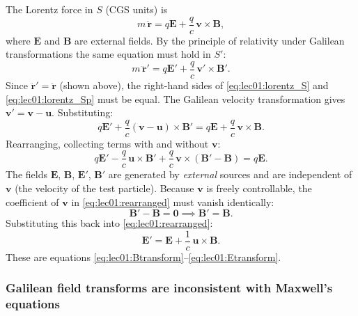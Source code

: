 The Lorentz force in $S$ (CGS units) is
\begin{equation}
  m\,\ddot{\mathbf{r}} = q\mathbf{E} + \frac{q}{c}\,\mathbf{v}\times\mathbf{B},
  \label{eq:lec01:lorentz_S}
\end{equation}
where $\mathbf{E}$ and $\mathbf{B}$ are external fields.
By the principle of relativity under Galilean transformations the same
equation must hold in $S'$:
\begin{equation}
  m\,\ddot{\mathbf{r}}' = q\mathbf{E}' + \frac{q}{c}\,\mathbf{v}'\times\mathbf{B}'.
  \label{eq:lec01:lorentz_Sp}
\end{equation}
Since $\ddot{\mathbf{r}}' = \ddot{\mathbf{r}}$ (shown above), the
right-hand sides of \eqref{eq:lec01:lorentz_S} and
\eqref{eq:lec01:lorentz_Sp} must be equal.
The Galilean velocity transformation gives
$\mathbf{v}' = \mathbf{v} - \mathbf{u}$.  Substituting:
\begin{equation}
  q\mathbf{E}' + \frac{q}{c}(\mathbf{v}-\mathbf{u})\times\mathbf{B}'
  = q\mathbf{E} + \frac{q}{c}\,\mathbf{v}\times\mathbf{B}.
  \label{eq:lec01:lorentz-force-match}
\end{equation}
Rearranging, collecting terms with and without $\mathbf{v}$:
\begin{equation}
  q\mathbf{E}' - \frac{q}{c}\,\mathbf{u}\times\mathbf{B}'
  + \frac{q}{c}\,\mathbf{v}\times(\mathbf{B}'-\mathbf{B})
  = q\mathbf{E}.
  \label{eq:lec01:rearranged}
\end{equation}
The fields $\mathbf{E}$, $\mathbf{B}$, $\mathbf{E}'$, $\mathbf{B}'$
are generated by \emph{external} sources and are independent of
$\mathbf{v}$ (the velocity of the test particle).  Because $\mathbf{v}$
is freely controllable, the coefficient of $\mathbf{v}$ in
\eqref{eq:lec01:rearranged} must vanish identically:
\begin{equation}
  \mathbf{B}' - \mathbf{B} = \mathbf{0}
  \implies
  \mathbf{B}' = \mathbf{B}.
  \label{eq:lec01:Btransform-derived}
\end{equation}
Substituting this back into \eqref{eq:lec01:rearranged}:
\begin{equation}
  \mathbf{E}' = \mathbf{E} + \frac{1}{c}\,\mathbf{u}\times\mathbf{B}.
  \label{eq:lec01:Etransform-derived}
\end{equation}
These are equations \eqref{eq:lec01:Btransform}–\eqref{eq:lec01:Etransform}.

\subsubsection*{Galilean field transforms are inconsistent with Maxwell's equations}

